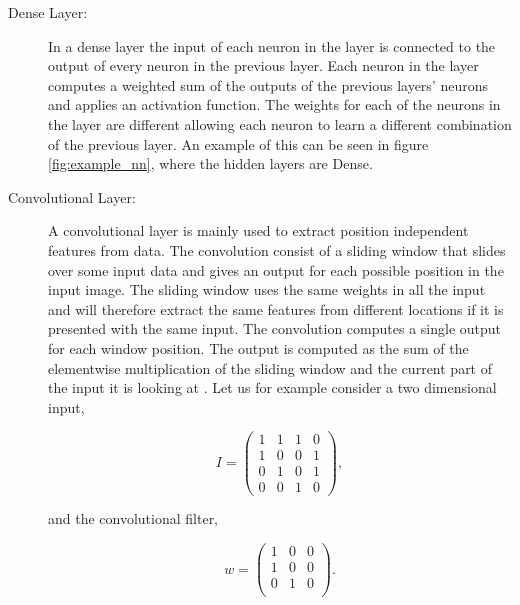\begin{description}
    \item[Dense Layer:] In a dense layer the input of each neuron in the
        layer is connected to the output of every neuron in the previous layer.
        Each neuron in the layer computes a weighted sum of the outputs of the
        previous layers' neurons and applies an activation function. The weights
        for each of the neurons in the layer are different allowing each neuron
        to learn a different combination of the previous layer. An example
        of this can be seen in figure \ref{fig:example_nn}, where the hidden
        layers are Dense.
    \item[Convolutional Layer:] A convolutional layer is mainly used to extract
        position independent features from data. The convolution consist of a
        sliding window that slides over some input data and gives an output for
        each possible position in the input image. The sliding window uses the
        same weights in all the input and will therefore extract the same
        features from different locations if it is presented with the same
        input. The convolution computes a single output for each window
        position. The output is computed as the sum of the elementwise
        multiplication of the sliding window and the current part of the input
        it is looking at \cite{oshea2015}. Let us for example consider a two
        dimensional input,

        \begin{equation}
            I = \begin{pmatrix}
                1 & 1 & 1 & 0 \\
                1 & 0 & 0 & 1 \\
                0 & 1 & 0 & 1 \\
                0 & 0 & 1 & 0
            \end{pmatrix},
        \end{equation}

        and the convolutional filter,

        \begin{equation}
            w = \begin{pmatrix}
                1 & 0 & 0 \\
                1 & 0 & 0 \\
                0 & 1 & 0 \\
            \end{pmatrix}.
        \end{equation}


\end{description}
